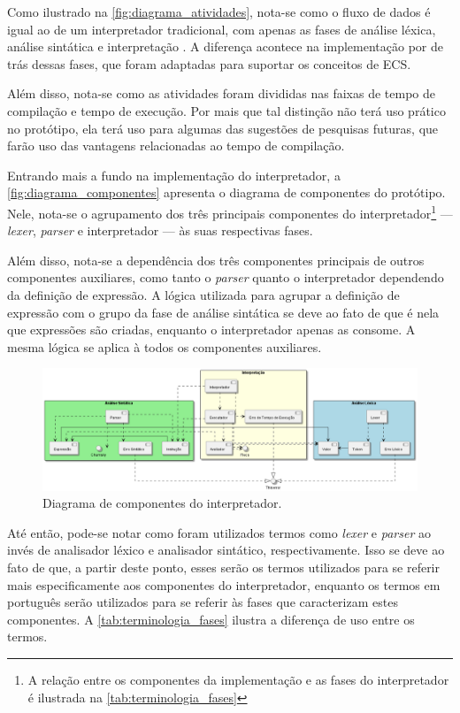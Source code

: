 Como ilustrado na \autoref{fig:diagrama_atividades}, nota-se como o fluxo de dados é igual ao de um interpretador tradicional, com apenas as fases de análise léxica, análise sintática e interpretação \cite{craftinginterpreters}. A diferença acontece na implementação por de trás dessas fases, que foram adaptadas para suportar os conceitos de ECS.

Além disso, nota-se como as atividades foram divididas nas faixas de tempo de compilação e tempo de execução. Por mais que tal distinção não terá uso prático no protótipo, ela terá uso para algumas das sugestões de pesquisas futuras, que farão uso das vantagens relacionadas ao tempo de compilação.

Entrando mais a fundo na implementação do interpretador, a \autoref{fig:diagrama_componentes} apresenta o diagrama de componentes do protótipo. Nele, nota-se o agrupamento dos três principais componentes do interpretador\footnote{A relação entre os componentes da implementação e as fases do interpretador é ilustrada na \autoref{tab:terminologia_fases}} — \textit{lexer}, \textit{parser} e interpretador — às suas respectivas fases.

Além disso, nota-se a dependência dos três componentes principais de outros componentes auxiliares, como tanto o \textit{parser} quanto o interpretador dependendo da definição de expressão. A lógica utilizada para agrupar a definição de expressão com o grupo da fase de análise sintática se deve ao fato de que é nela que expressões são criadas, enquanto o interpretador apenas as consome. A mesma lógica se aplica à todos os componentes auxiliares.

\begin{figure}[H]
	\centering
	\includegraphics[width=0.65\textheight]{../diagrams/diagrama_componentes.png}
	\caption{Diagrama de componentes do interpretador.}
	\label{fig:diagrama_componentes}
\end{figure}

Até então, pode-se notar como foram utilizados termos como \textit{lexer} e \textit{parser} ao invés de analisador léxico e analisador sintático, respectivamente. Isso se deve ao fato de que, a partir deste ponto, esses serão os termos utilizados para se referir mais especificamente aos componentes do interpretador, enquanto os termos em português serão utilizados para se referir às fases que caracterizam estes componentes. A \autoref{tab:terminologia_fases} ilustra a diferença de uso entre os termos.

